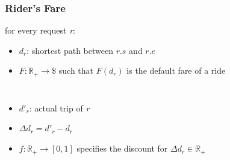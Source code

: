 \documentclass[t]{beamer}
\begin{document}
\begin{frame}\frametitle{Rider's Fare}
for every request \textit{r}:
\begin{itemize}
\item<1-> $d_r$: shortest path between $r.s$ and $r.e$
\item<2-> $F: \mathbb{R}_{+}  \rightarrow \$ $ such that $F(d_r)$ is the default fare of a ride
\end{itemize}
\begin{columns}
\begin{itemize}
\item<3-> $d'_r$: actual trip of \textit{r}
\item<3-> $\Delta d_r = d'_r - d_r$
\item<4-> $f: \mathbb{R}_{+} \rightarrow \left[ 0, 1 \right] $ specifies the discount for $\Delta d_r \in \mathbb{R}_{+}$
\end{itemize}
\vspace{0.25in}

\end{columns}
\end{frame}
\end{document}
